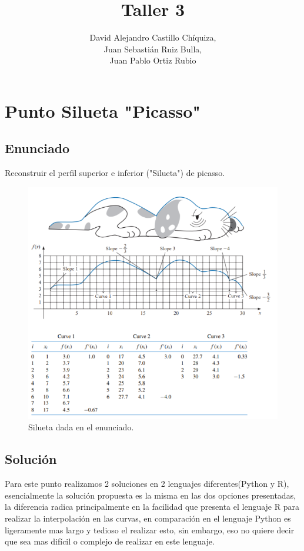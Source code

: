 \documentclass[10pt,letterpaper]{article}
\date{}
\author{David Alejandro Castillo Chíquiza,\\ Juan Sebastián Ruiz Bulla,\\ Juan Pablo Ortiz Rubio}
\title{Taller 3}
\begin{document}
\maketitle

\section{Punto Silueta "Picasso"}

	\subsection{Enunciado}
	Reconstruir el perfil superior e inferior ("Silueta") de picasso.
	\begin{figure}[H]
		\includegraphics[scale=0.5]{EnunciadoSilueta}
		\centering
		\caption{Silueta dada en el enunciado.}
		\centering
	\end{figure}

	\subsection{Solución}
	Para este punto realizamos 2 soluciones en 2 lenguajes diferentes(Python y R), esencialmente la solución propuesta es la misma en las dos opciones presentadas, la diferencia radica principalmente en la facilidad que presenta el lenguaje R para realizar la interpolación en las curvas, en comparación en el lenguaje Python es ligeramente mas largo y tedioso el realizar esto, sin embargo, eso no quiere decir que sea mas difícil o complejo de realizar en este lenguaje.\\
	
\end{document}
